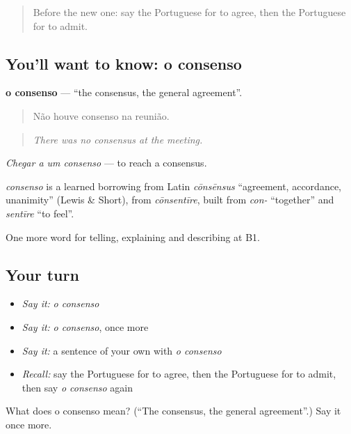 \begin{quote}
Before the new one: say the Portuguese for to agree, then the Portuguese for to admit.
\end{quote}

\subsection*{You'll want to know: o consenso}
\textbf{o consenso} — \textquotedblleft{}the consensus, the general agreement\textquotedblright{}.

\begin{quote}
Não houve consenso na reunião.
\end{quote}

\begin{quote}
\emph{There was no consensus at the meeting.}
\end{quote}

\emph{Chegar a um consenso} — to reach a consensus.

\begin{cousinweb}
\emph{consenso} is a learned borrowing from Latin \emph{cōnsēnsus} \textquotedblleft{}agreement, accordance, unanimity\textquotedblright{} (Lewis \& Short), from \emph{cōnsentīre}, built from \emph{con-} \textquotedblleft{}together\textquotedblright{} and \emph{sentīre} \textquotedblleft{}to feel\textquotedblright{}.
\end{cousinweb}

\begin{grammarlens}[title={What you've built}]
One more word for telling, explaining and describing at B1.
\end{grammarlens}

\subsection*{Your turn}
\begin{itemize}
\raggedright
  \item \emph{Say it:} \emph{o consenso}
  \item \emph{Say it:} \emph{o consenso}, once more
  \item \emph{Say it:} a sentence of your own with \emph{o consenso}
  \item \emph{Recall:} say the Portuguese for to agree, then the Portuguese for to admit, then say \emph{o consenso} again
\end{itemize}

\begin{tcolorbox}[breakable,colback=teal!4,colframe=teal!35!black,title={Before you move on}]
What does o consenso mean? (\textquotedblleft{}The consensus, the general agreement\textquotedblright{}.) Say it once more.
\end{tcolorbox}
